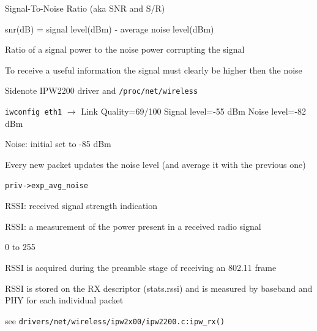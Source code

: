 \documentclass[9pt]{article}
\begin{document}
\begin{slide}
\bi
	\item Signal-To-Noise Ratio (aka SNR and S/R)
	\item snr(dB) = signal level(dBm) - average noise level(dBm)
	\item Ratio of a signal power to the noise power corrupting the signal
	\item To receive a useful information the signal must clearly be higher then the noise
	\item Sidenote IPW2200 driver and \verb+/proc/net/wireless+
	\bi
		\item \verb+iwconfig eth1+ $\rightarrow$ Link Quality=69/100  Signal level=-55 dBm  Noise level=-82 dBm
		\item Noise: initial set to -85 dBm
		\item Every new packet updates the noise level (and average it with the previous one)
		\item \verb+priv->exp_avg_noise+
		\item RSSI: received signal strength indication
		\item RSSI: a measurement of the power present in a received radio signal
		\item 0 to 255
		\item RSSI is acquired during the preamble stage of receiving an 802.11 frame
		\item RSSI is stored on the RX descriptor (stats.rssi) and is measured by baseband and PHY for each individual packet
		\item see \verb+drivers/net/wireless/ipw2x00/ipw2200.c:ipw_rx()+
	\ei
\ei
\end{slide}
\end{document}
